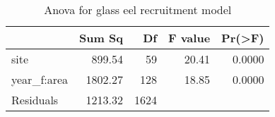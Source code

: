 \begin{table}[htbp]
\centering
\caption[table_anova]{Anova for glass eel recruitment model} 
\begin{tabularx}{0.8\textwidth}{lrrrr}
  \hline
 & Sum Sq & Df & F value & Pr(>F) \\ 
  \hline
site & 899.54 & 59 & 20.41 & 0.0000 \\ 
  year\_f:area & 1802.27 & 128 & 18.85 & 0.0000 \\ 
  Residuals & 1213.32 & 1624 &  &  \\ 
   \hline
\end{tabularx}
\end{table}
